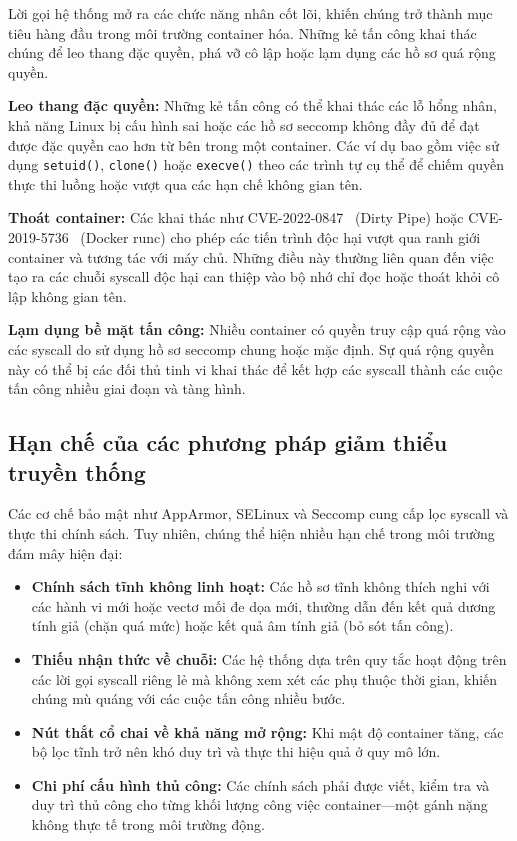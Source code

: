Lời gọi hệ thống mở ra các chức năng nhân cốt lõi, khiến chúng trở thành mục tiêu hàng đầu trong môi trường container hóa. Những kẻ tấn công khai thác chúng để leo thang đặc quyền, phá vỡ cô lập hoặc lạm dụng các hồ sơ quá rộng quyền.

\textbf{Leo thang đặc quyền:} Những kẻ tấn công có thể khai thác các lỗ hổng nhân, khả năng Linux bị cấu hình sai hoặc các hồ sơ seccomp không đầy đủ để đạt được đặc quyền cao hơn từ bên trong một container. Các ví dụ bao gồm việc sử dụng \texttt{setuid()}, \texttt{clone()} hoặc \texttt{execve()} theo các trình tự cụ thể để chiếm quyền thực thi luồng hoặc vượt qua các hạn chế không gian tên.

\textbf{Thoát container:} Các khai thác như \mbox{CVE-2022-0847}~\cite{cve_2022_0847} (Dirty Pipe) hoặc \mbox{CVE-2019-5736}~\cite{cve_2019_5736} (Docker runc) cho phép các tiến trình độc hại vượt qua ranh giới container và tương tác với máy chủ. Những điều này thường liên quan đến việc tạo ra các chuỗi syscall độc hại can thiệp vào bộ nhớ chỉ đọc hoặc thoát khỏi cô lập không gian tên.

\textbf{Lạm dụng bề mặt tấn công:} Nhiều container có quyền truy cập quá rộng vào các syscall do sử dụng hồ sơ seccomp chung hoặc mặc định. Sự quá rộng quyền này có thể bị các đối thủ tinh vi khai thác để kết hợp các syscall thành các cuộc tấn công nhiều giai đoạn và tàng hình.

\subsection{Hạn chế của các phương pháp giảm thiểu truyền thống}
\label{subsec:traditional_limitations}

Các cơ chế bảo mật như AppArmor, SELinux và Seccomp cung cấp lọc syscall và thực thi chính sách. Tuy nhiên, chúng thể hiện nhiều hạn chế trong môi trường đám mây hiện đại:

\begin{itemize}
  \item \textbf{Chính sách tĩnh không linh hoạt:} Các hồ sơ tĩnh không thích nghi với các hành vi mới hoặc
        vectơ mối đe dọa mới, thường dẫn đến kết quả dương tính giả (chặn quá mức) hoặc kết quả âm tính
        giả (bỏ sót tấn công).
  \item \textbf{Thiếu nhận thức về chuỗi:} Các hệ thống dựa trên quy tắc hoạt động trên các lời gọi
        syscall riêng lẻ mà không xem xét các phụ thuộc thời gian, khiến chúng mù quáng với các cuộc tấn
        công nhiều bước.
  \item \textbf{Nút thắt cổ chai về khả năng mở rộng:} Khi mật độ container tăng, các bộ lọc tĩnh trở nên
        khó duy trì và thực thi hiệu quả ở quy mô lớn.
  \item \textbf{Chi phí cấu hình thủ công:} Các chính sách phải được viết, kiểm tra và duy trì thủ công cho
        từng khối lượng công việc container---một gánh nặng không thực tế trong môi trường động.
\end{itemize}

